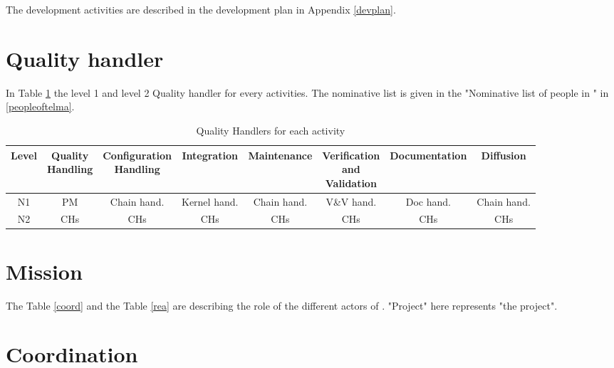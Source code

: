 The development activities are described in the development plan in Appendix
\ref{devplan}.

\section{Quality handler}

In Table \ref{aqTable} the level 1 and level 2 Quality handler for every \telemacsystem
activities. The nominative list is given in the "Nominative list of people in
\telemacsystem" in \ref{peopleoftelma}.

\begin{table}[H]
\begin{tabular}{|*{8}{c|}}
\hline
Level & \minibox{Quality\\Handling} & \minibox{Configuration\\Handling} & Integration & Maintenance & \minibox[c]{Verification\\and\\Validation} & Documentation & Diffusion\\
\hline
N1 & PM  & Chain hand. & Kernel hand. & Chain hand. & V\&V hand. & Doc hand. & Chain hand.\\
N2 & CHs & CHs         & CHs          & CHs         & CHs        & CHs       & CHs        \\
\hline
\end{tabular}
\caption{\label{aqTable}Quality Handlers for each activity}
\end{table}

\section{Mission}

The Table \ref{coord} and the Table \ref{rea} are describing the role of the
different actors of \telemacsystem. "Project" here represents "the \telemacsystem project".

\section{Coordination}

